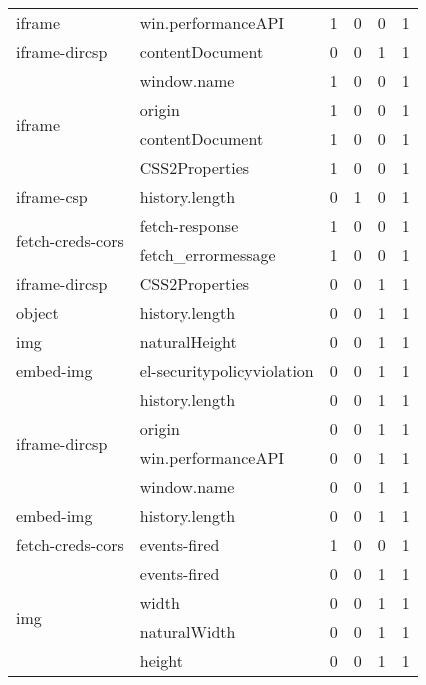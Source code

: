 \begin{tabular}{llrrrr}
iframe & win.performanceAPI & 1 & 0 & 0 & 1 \\
iframe-dircsp & contentDocument & 0 & 0 & 1 & 1 \\
\multirow[c]{4}{*}{iframe} & window.name & 1 & 0 & 0 & 1 \\
 & origin & 1 & 0 & 0 & 1 \\
 & contentDocument & 1 & 0 & 0 & 1 \\
 & CSS2Properties & 1 & 0 & 0 & 1 \\
iframe-csp & history.length & 0 & 1 & 0 & 1 \\
\multirow[c]{2}{*}{fetch-creds-cors} & fetch-response & 1 & 0 & 0 & 1 \\
 & fetch_errormessage & 1 & 0 & 0 & 1 \\
iframe-dircsp & CSS2Properties & 0 & 0 & 1 & 1 \\
object & history.length & 0 & 0 & 1 & 1 \\
img & naturalHeight & 0 & 0 & 1 & 1 \\
embed-img & el-securitypolicyviolation & 0 & 0 & 1 & 1 \\
\multirow[c]{4}{*}{iframe-dircsp} & history.length & 0 & 0 & 1 & 1 \\
 & origin & 0 & 0 & 1 & 1 \\
 & win.performanceAPI & 0 & 0 & 1 & 1 \\
 & window.name & 0 & 0 & 1 & 1 \\
embed-img & history.length & 0 & 0 & 1 & 1 \\
fetch-creds-cors & events-fired & 1 & 0 & 0 & 1 \\
\multirow[c]{4}{*}{img} & events-fired & 0 & 0 & 1 & 1 \\
 & width & 0 & 0 & 1 & 1 \\
 & naturalWidth & 0 & 0 & 1 & 1 \\
 & height & 0 & 0 & 1 & 1 \\
\bottomrule
\end{tabular}
